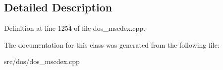 \subsection{Detailed Description}


Definition at line 1254 of file dos\-\_\-mscdex.\-cpp.



The documentation for this class was generated from the following file\-:\begin{DoxyCompactItemize}
\item 
src/dos/dos\-\_\-mscdex.\-cpp\end{DoxyCompactItemize}
